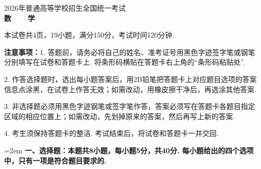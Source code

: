 \documentclass[12pt,a4paper]{article}
\begin{document}
	\vspace*{0.5cm}
	\begin{center}
		{\Large 2026年普通高等学校招生全国统一考试}\\[0.8cm]
		{\LARGE\bfseries 数~~~~学}
	\end{center}
	
	\noindent 本试卷共4页，19小题，满分150分，考试时间120分钟.
	
	\noindent\hangindent=73pt {\bfseries 注意事项：}1. 答题前，请务必将自己的姓名、准考证号用黑色字迹签字笔或钢笔分别填写在试卷和答题卡上. 将条形码横贴在答题卡右上角的“条形码粘贴处”.
	
	\noindent\hangindent=73pt\hspace{61pt}2. 作答选择题时，选出每小题答案后，用2B铅笔把答题卡上对应题目选项的答案信息点涂黑，在试卷上作答无效；如需改动，用橡皮擦干净后，再选涂其他答案.
	
	\noindent\hangindent=73pt\hspace{61pt}3. 非选择题必须用黑色字迹钢笔或签字笔作答，答案必须写在答题卡各题目指定区域的相应位置上；如需改动，先划掉原来的答案，然后再写上新的答案.
	
	\noindent\hangindent=73pt\hspace{61pt}4. 考生须保持答题卡的整洁. 考试结束后，将试卷和答题卡一并交回.
	
	\vspace{0.3cm}
	
	\noindent\hangindent=2em {\bfseries 一、选择题：本题共8小题，每小题5分，共40分. 每小题给出的四个选项中，只有一项是符合题目要求的.}
	
\end{document}
